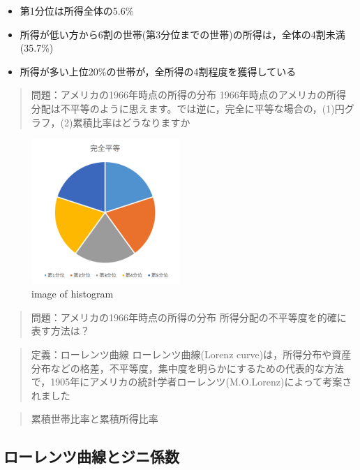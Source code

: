 \documentclass[
]{book}
\providecommand{\tightlist}{%
  \setlength{\itemsep}{0pt}\setlength{\parskip}{0pt}}
\theoremstyle{definition}
\theoremstyle{definition}
\theoremstyle{definition}
\theoremstyle{definition}
\theoremstyle{remark}
\begin{document}
\begin{itemize}
\tightlist
\item
  第1分位は所得全体の5.6\%
\item
  所得が低い方から6割の世帯(第3分位までの世帯)の所得は，全体の4割未満(35.7\%)
\item
  所得が多い上位20\%の世帯が，全所得の4割程度を獲得している
\end{itemize}

\begin{quote}
問題：アメリカの1966年時点の所得の分布
1966年時点のアメリカの所得分配は不平等のように思えます。では逆に，完全に平等な場合の，(1)円グラフ，(2)累積比率はどうなりますか
\end{quote}

\begin{figure}
\centering
\includegraphics[width=0.5\textwidth,height=\textheight]{images/lec03/fig_income_dist_perfectly_equal.png}
\caption{image of histogram}
\end{figure}

\begin{quote}
問題：アメリカの1966年時点の所得の分布
所得分配の不平等度を的確に表す方法は？
\end{quote}

\begin{quote}
定義：ローレンツ曲線
ローレンツ曲線(Lorenz curve)は，所得分布や資産分布などの格差，不平等度，集中度を明らかにするための代表的な方法で，1905年にアメリカの統計学者ローレンツ(M.O.Lorenz)によって考案されました
\end{quote}

\begin{quote}
累積世帯比率と累積所得比率
\end{quote}

\hypertarget{ux30edux30fcux30ecux30f3ux30c4ux66f2ux7ddaux3068ux30b8ux30cbux4fc2ux6570}{%
\subsection{ローレンツ曲線とジニ係数}\label{ux30edux30fcux30ecux30f3ux30c4ux66f2ux7ddaux3068ux30b8ux30cbux4fc2ux6570}}
\end{document}
